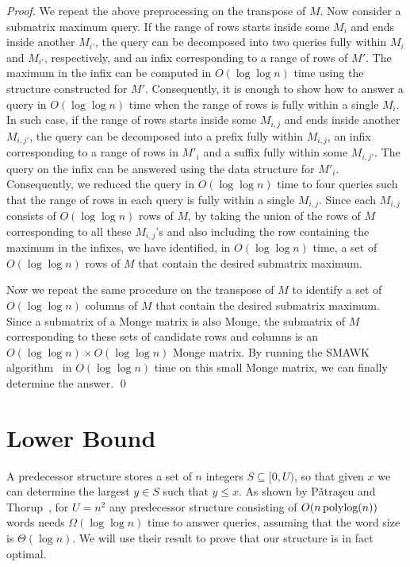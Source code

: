 \documentclass{llncs}
\newcommand{\polylog}{\text{\,polylog}}
\begin{document}
\begin{proof}
We repeat the above preprocessing on the transpose of $M$.
Now consider a submatrix maximum query. If the range of rows starts inside some $M_{i}$ and 
ends inside another $M_{i'}$, the query can be decomposed into two queries fully within $M_{i}$ and
$M_{i'}$, respectively, and an infix corresponding to a range of rows of $M'$. The maximum
in the infix can be computed in $O(\log\log n)$ time using the structure constructed
for $M'$. Consequently, it is enough to show how to answer a query in $O(\log\log n)$
time when the range of rows is fully within a single $M_{i}$. In such case, if the range of rows
starts inside some $M_{i,j}$ and ends inside another $M_{i,j'}$, the query can be decomposed
into a prefix fully within $M_{i,j}$, an infix corresponding to a range of rows in $M'_{i}$
and a suffix fully within some $M_{i,j'}$. 
The query on the infix can be answered using the data structure for $M'_{i}$. 
Consequently, we reduced the  query  in $O(\log\log n)$ time to four
queries such that the range of rows in each query is fully
within a single $M_{i,j}$.
Since each $M_{i,j}$ consists of $O(\log\log n)$ rows of $M$,
by taking the union of the rows of $M$ corresponding to all
these $M_{i,j}$'s and also including the row containing the maximum in the infixes,
we have identified, in $O(\log\log n)$ time, a set of $O(\log\log n)$ rows of
$M$ that contain the desired submatrix maximum. 

Now we repeat the same procedure on the transpose of $M$ to identify a set of
$O(\log\log n)$ columns of $M$ that contain the desired submatrix
maximum.
Since a submatrix of a Monge matrix is also Monge, the submatrix of
$M$ corresponding to these sets of candidate rows and columns is an
$O(\log\log n) \times O(\log\log n)$ Monge matrix. 
By running the SMAWK algorithm~\cite{SMAWK} in $O(\log\log n)$ time on
this small
Monge matrix, we can finally determine the answer.
\qed \end{proof}



\section{Lower Bound}
\label{sec:lower bound}
A predecessor structure stores a set of $n$ integers $S\subseteq [0,U)$, so that given $x$ we can determine the largest $y\in S$
such that $y\leq x$. As shown by P{\v{a}}tra{\c{s}}cu and Thorup~\cite{PT2006}, for $U=n^{2}$
any predecessor structure consisting of $O(n \polylog(n))$ words needs $\Omega(\log\log n)$ time to answer queries,
assuming that the word size is $\Theta(\log n)$. We will use their result to prove that our structure is in fact optimal.
\end{document}
